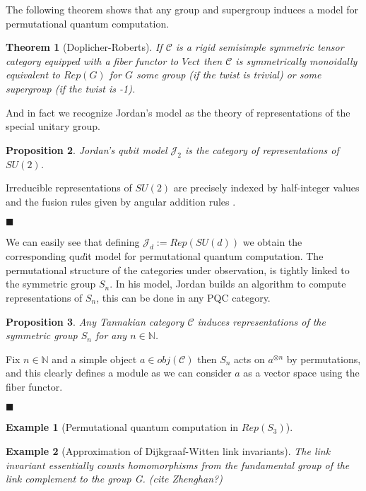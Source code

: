 \documentclass{article}
\newtheorem{example}{Example}
\newtheorem{theorem}{Theorem}
\newtheorem{proposition}[theorem]{Proposition}
\newenvironment{proof}[1][Proof]{\begin{trivlist}
\item[\hskip \labelsep {\bfseries #1}]}{\begin{flushright}$\blacksquare$\end{flushright} \end{trivlist}}
\newcommand{\cat}{\mathcal{C}}
\begin{document}
The following theorem shows that any group and supergroup induces a model for permutational quantum computation.
\begin{theorem}[Doplicher-Roberts]
	If $\mathcal{C}$ is a rigid semisimple symmetric tensor category equipped with a fiber functor to $Vect$ then $\mathcal{C}$ is symmetrically monoidally equivalent to $Rep(G)$ for $G$ some group (if the twist is trivial) or some supergroup (if the twist is -1).
\end{theorem}
And in fact we recognize Jordan's model as the theory of representations of the special unitary group.
\begin{proposition}
	Jordan's qubit model $\mathcal{J}_2$ is the category of representations of $SU(2)$.
\end{proposition}
\begin{proof}
	Irreducible representations of $SU(2)$ are precisely indexed by half-integer values and the fusion rules given by angular addition rules \cite{Woit17}.
\end{proof}
We can easily see that defining $\mathcal{J}_d := Rep(SU(d))$ we obtain the corresponding qu$d$it model for permutational quantum computation. The permutational structure of the categories under observation, is tightly linked to the symmetric group $S_n$. In his model, Jordan builds an algorithm to compute representations of $S_n$, this can be done in any PQC category.
\begin{proposition}
	Any Tannakian category $\cat$ induces representations of the symmetric group $S_n$ for any $n\in \mathbb{N}$.
\end{proposition}
\begin{proof}
	Fix $n \in \mathbb{N}$ and a simple object $a \in obj(\cat)$ then $S_n$ acts on $a^{\otimes n}$ by permutations, and this clearly defines a module as we can consider $a$ as a vector space using the fiber functor.
\end{proof}


\begin{example}[Permutational quantum computation in $Rep(S_3)$]
\end{example}

\begin{example}[Approximation of Dijkgraaf-Witten link invariants]
	The link invariant essentially counts homomorphisms from the fundamental group
	of the link complement to the group G. (cite Zhenghan?)
\end{example}
\end{document}
